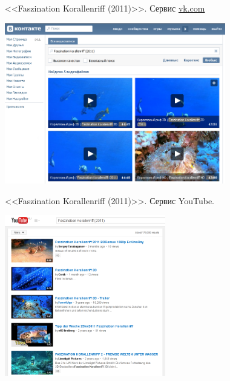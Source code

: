 \begin{frame}{<<Faszination Korallenriff (2011)>>. Сервис \href{http://vk.com/}{vk.com}}
    \begin{center}
        \includegraphics[height=7cm]{img/video/video-reranking-vk.png}
    \end{center}
\end{frame}


\begin{frame}{<<Faszination Korallenriff (2011)>>. Сервис YouTube.}
    \begin{center}
        \includegraphics[height=7cm]{img/video/video-reranking-youtube.png}
    \end{center}
\end{frame}
